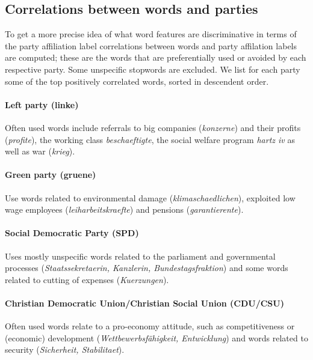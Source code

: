 \documentclass[11pt]{article}
\begin{document}
%
\subsection{Correlations between words and parties}\label{sec:word_party_correlations}
To get a more precise idea of what word features are discriminative in terms of the party affiliation label correlations between words and party affilation labels are computed; these are the words that are preferentially used or avoided by each respective party. Some unspecific stopwords are excluded. We list for each party some of the top positively correlated words, sorted in descendent order.
\paragraph{\bf Left party (linke)} Often used words include referrals to big companies ({\em konzerne}) and their profits ({\em profite}), the working class {\em beschaeftigte}, the social welfare program {\em hartz iv} as well as war ({\em krieg}).
\paragraph{\bf Green party (gruene)} Use words related to environmental damage ({\em klimaschaedlichen}), exploited low wage employees ({\em leiharbeitskraefte}) and pensions ({\em garantierente}).
\paragraph{\bf Social Democratic Party (SPD)} Uses mostly unspecific words related to the parliament and governmental processes ({\em Staatssekretaerin, Kanzlerin, Bundestagsfraktion}) and some words related to cutting of expenses ({\em Kuerzungen}).
\paragraph{\bf Christian Democratic Union/Christian Social Union (CDU/CSU)}
Often used words relate to a pro-economy attitude, such as competitiveness or (economic) development ({\em Wettbewerbsf\"ahigkeit, Entwicklung}) and words related to security ({\em Sicherheit, Stabilitaet}). 
\end{document}
